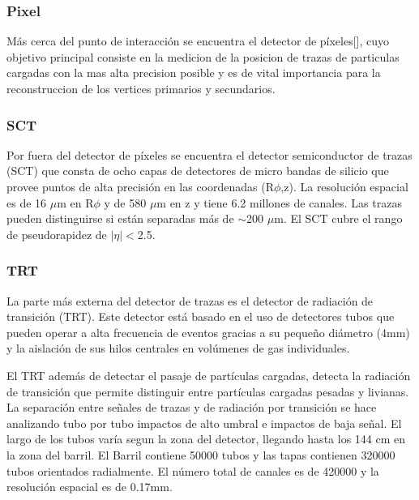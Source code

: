 \subsubsection{Pixel}

Más cerca del punto de interacción se encuentra el detector de píxeles[], cuyo
objetivo principal consiste en la medicion de la posicion de trazas de
particulas cargadas con la mas alta precision posible y es de vital importancia
para la reconstruccion de los vertices primarios y secundarios.



\subsubsection{SCT}
Por fuera del detector de píxeles se encuentra el detector semiconductor de
trazas (SCT) que consta de ocho capas de detectores de micro bandas de silicio
que provee puntos de alta precisión en las coordenadas (R$\phi$,z). La
resolución espacial es de 16 $\mu$m en R$\phi$ y de 580 $\mu$m en z y tiene 6.2
millones de canales. Las trazas pueden distinguirse si están separadas más de
$\sim$200 $ \mu$m. El SCT cubre el rango de pseudorapidez de $|\eta|<$2.5.


\subsubsection{TRT}
La parte más externa del detector de trazas es el detector de radiación de
transición (TRT). Este detector está basado en el uso de detectores tubos que
pueden operar a alta frecuencia de eventos gracias a su pequeño diámetro (4mm) y
la aislación de sus hilos centrales en volúmenes de gas individuales.

El TRT además de detectar el pasaje de partículas cargadas, detecta la radiación
de transición que permite distinguir entre partículas cargadas pesadas y
livianas. La separación entre señales de trazas y de radiación por transición se
hace analizando tubo por tubo impactos de alto umbral e impactos de baja señal.
El largo de los tubos varía segun la zona del detector, llegando hasta los 144
cm en la zona del barril. El Barril contiene 50000 tubos y las tapas contienen
320000 tubos orientados radialmente. El número total de canales es de 420000 y
la resolución espacial es de 0.17mm.


